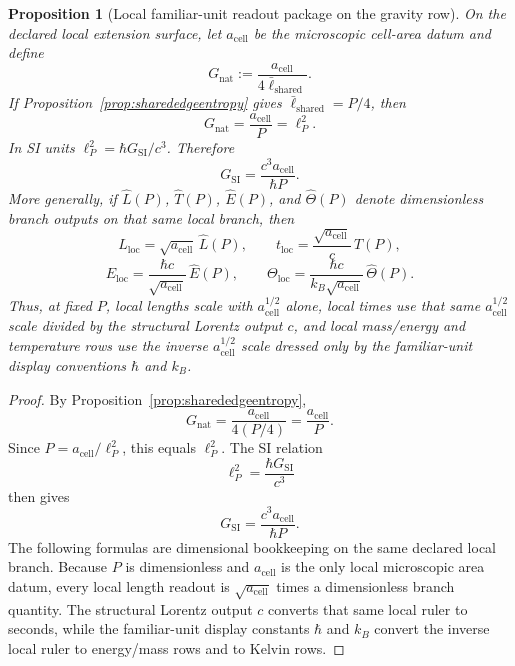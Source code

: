 \documentclass[11pt]{article}
\newtheorem{proposition}[theorem]{Proposition}
\newcommand{\ellbar}{\bar{\ell}}
\begin{document}
\begin{proposition}[Local familiar-unit readout package on the gravity row]\label{prop:gsi}
On the declared local extension surface, let \(a_{\mathrm{cell}}\) be the microscopic cell-area datum and define
\[
G_{\mathrm{nat}}:=\frac{a_{\mathrm{cell}}}{4\ellbar_{\mathrm{shared}}}.
\]
If Proposition~\ref{prop:sharededgeentropy} gives \(\ellbar_{\mathrm{shared}}=P/4\), then
\[
G_{\mathrm{nat}}=\frac{a_{\mathrm{cell}}}{P}=\ell_P^2.
\]
In SI units \(\ell_P^2=\hbar G_{\mathrm{SI}}/c^3\). Therefore
\[
G_{\mathrm{SI}}
=
\frac{c^3 a_{\mathrm{cell}}}{\hbar P}.
\]
More generally, if \(\widehat L(P)\), \(\widehat T(P)\), \(\widehat E(P)\), and
\(\widehat\Theta(P)\) denote dimensionless branch outputs on that same local branch, then
\[
L_{\mathrm{loc}}=\sqrt{a_{\mathrm{cell}}}\,\widehat L(P),
\qquad
t_{\mathrm{loc}}=\frac{\sqrt{a_{\mathrm{cell}}}}{c}\,\widehat T(P),
\]
\[
E_{\mathrm{loc}}=\frac{\hbar c}{\sqrt{a_{\mathrm{cell}}}}\,\widehat E(P),
\qquad
\Theta_{\mathrm{loc}}=\frac{\hbar c}{k_B\sqrt{a_{\mathrm{cell}}}}\,\widehat\Theta(P).
\]
Thus, at fixed \(P\), local lengths scale with \(a_{\mathrm{cell}}^{1/2}\) alone, local times
use that same \(a_{\mathrm{cell}}^{1/2}\) scale divided by the structural Lorentz output \(c\),
and local mass/energy and temperature rows use the inverse \(a_{\mathrm{cell}}^{1/2}\) scale
dressed only by the familiar-unit display conventions \(\hbar\) and \(k_B\).
\end{proposition}

\begin{proof}
By Proposition~\ref{prop:sharededgeentropy},
\[
G_{\mathrm{nat}}
=
\frac{a_{\mathrm{cell}}}{4(P/4)}
=
\frac{a_{\mathrm{cell}}}{P}.
\]
Since \(P=a_{\mathrm{cell}}/\ell_P^2\), this equals \(\ell_P^2\). The SI relation
\[
\ell_P^2=\frac{\hbar G_{\mathrm{SI}}}{c^3}
\]
then gives
\[
G_{\mathrm{SI}}
=
\frac{c^3 a_{\mathrm{cell}}}{\hbar P}.
\]
The following formulas are dimensional bookkeeping on the same declared local branch. Because \(P\)
is dimensionless and \(a_{\mathrm{cell}}\) is the only local microscopic area datum, every local
length readout is \(\sqrt{a_{\mathrm{cell}}}\) times a dimensionless branch quantity. The structural
Lorentz output \(c\) converts that same local ruler to seconds, while the familiar-unit display
constants \(\hbar\) and \(k_B\) convert the inverse local ruler to energy/mass rows and to Kelvin
rows. \qedhere
\end{proof}
\end{document}
